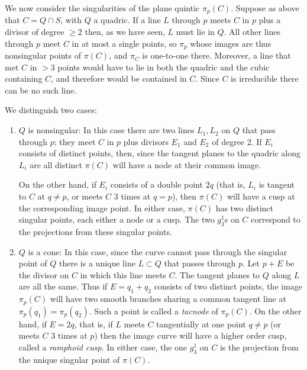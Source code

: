 We now consider the singularities of the plane quintic $\pi_p(C)$. Suppose as above that $C = Q\cap S$, with $Q$ a quadric. If a line $L$ through $p$ meets $C$ in $p$ plus a divisor of degree $\geq 2$ then, as we have seen, $L$ must lie in $Q$.  All other lines through $p$ meet $C$ in at most a single points, so $\pi_p$ whose images are thus nonsingular points of $\pi(C)$, and $\pi_C$ is one-to-one there. Moreover, a line that met $C$ in $>3$ points would have to lie in both the quadric and the cubic containing $C$, and therefore would be contained in $C$. Since $C$ is irreducible there can be no such line.

We distinguish two cases:

\begin{enumerate}
\item $Q$ is nonsingular:
In this case there are two lines $L_1, L_2$ on $Q$ that pass through $p$; they meet $C$ in $p$ plus divisors $E_1$ and $E_2$ of degree 2. If $E_i$ consists of distinct points, then, since the tangent planes to the quadric along $L_i$ are all distinct $\pi(C)$ will have a node at their common image. 


On the other hand, if $E_i$ consists of a double point $2q$ (that is, $L_i$ is tangent to $C$ at $q\neq p$, or meets $C$ 3 times at $q = p$), then $\pi(C)$ will have a cusp at the corresponding image point. 
In either case, $\pi(C)$ has two distinct singular points, each either a node or a cusp. The two $g^1_3$s on $C$ correspond to the projections from these singular points.

\item $Q$ is a cone:
In this case, since the curve cannot pass through the singular point of $Q$ there is a unique line $L\subset Q$ that passes through $p$. Let $p+E$ be the divisor on $C$ in which this line meets $C$. The tangent planes to $Q$ along $L$ are all the same. Thus if $E = q_1+q_2$ consists of two distinct points, the image $\pi_p(C)$ will have two smooth branches sharing a common tangent line at
$\pi_p(q_1) = \pi_p(q_2)$. Such a point is called a \emph{tacnode} of $\pi_p(C)$. On the other hand, if $E= 2q$, that is, if $L$ meets $C$ tangentially at one point $q\neq p$ (or meets $C$ 3 times at $p$) then the image curve will have a higher order cusp, called a \emph{ramphoid cusp}. In either case, the one $g^1_3$ on $C$ is the projection from the unique singular point of $\pi(C)$.
\end{enumerate}

